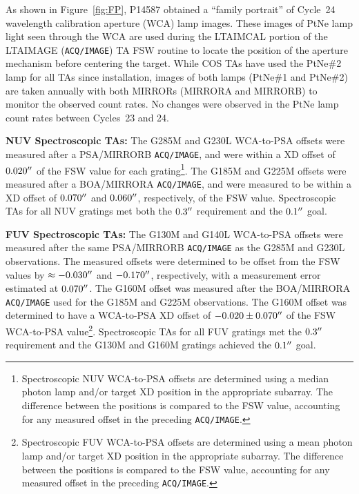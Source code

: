 \documentclass[12pt]{reportj}
\def\arcsec{\hbox{$^{\prime\prime}$}}
\newcommand{\pid}[1]{{\rm P}#1}
\newcommand{\tacq}[1]{\texttt{ACQ/#1}}
\begin{document}
\begin{description}
	As shown in Figure~\ref{fig:FP}, \pid{14587} obtained a ``family portrait'' of Cycle~24 wavelength calibration aperture (WCA) lamp images. These images of PtNe lamp light seen through the WCA
	are used during the LTAIMCAL portion of the LTAIMAGE (\tacq{IMAGE}) TA FSW routine to locate the position of the aperture mechanism before centering the target.
	While COS TAs have used the PtNe\#2 lamp for all TAs since installation, images of both lamps (PtNe\#1 and PtNe\#2) are taken annually with both MIRRORs
	(MIRRORA and MIRRORB) to monitor the observed count rates. No changes were observed in the PtNe lamp count rates between Cycles~23 and 24.
	\clearpage
\item{\bf NUV Spectroscopic TAs:}
	The G285M and G230L WCA-to-PSA offsets were measured after a PSA/MIRRORB \tacq{IMAGE}, and were within a XD offset of $0.020\arcsec$ of the FSW value for each grating\footnote{Spectroscopic NUV WCA-to-PSA offsets are determined using a median photon lamp and/or target XD position in the appropriate subarray. The difference between the positions is compared to the FSW value, accounting for any measured offset in the preceding \tacq{IMAGE}.}.
	The G185M and G225M offsets were measured after a BOA/MIRRORA \tacq{IMAGE}, and were measured to be within a XD offset of $0.070\arcsec$ and $0.060\arcsec$, respectively, of the FSW value.
	Spectroscopic TAs for all NUV gratings met both the $0.3\arcsec$ requirement and the $0.1\arcsec$ goal.
\item{\bf FUV Spectroscopic TAs:}
	The G130M and G140L WCA-to-PSA offsets were measured after the same PSA/MIRRORB \tacq{IMAGE} as the G285M and G230L observations.
	The measured offsets were determined to be offset from the FSW values by $\approx -0.030\arcsec$ and $-0.170\arcsec$, respectively, with a measurement error estimated at $0.070\arcsec$.
	The G160M offset was measured after the BOA/MIRRORA \tacq{IMAGE} used for the G185M and G225M observations. The G160M offset was determined to have a WCA-to-PSA XD offset of $-0.020 \pm 0.070\arcsec$ of the FSW WCA-to-PSA value\footnote{Spectroscopic FUV WCA-to-PSA offsets are determined using a mean photon lamp and/or target XD position in the appropriate subarray. The difference between the positions is compared to the FSW value, accounting for any measured offset in the preceding \tacq{IMAGE}.}.
	Spectroscopic TAs for all FUV gratings met the $0.3\arcsec$ requirement and the G130M and G160M gratings achieved the $0.1\arcsec$ goal.
\end{description}
\end{document}
